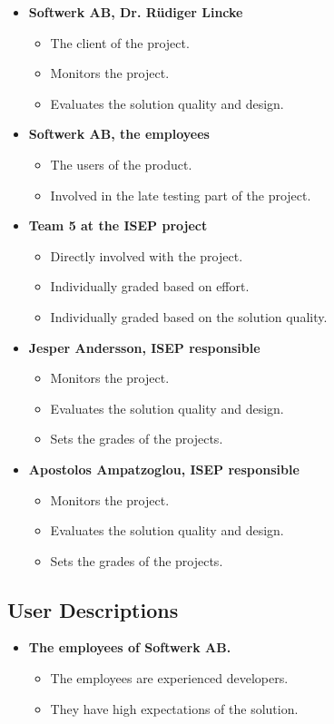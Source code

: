 \begin{itemize}
\item \textbf{Softwerk AB, Dr. Rüdiger Lincke}
\begin{itemize}
\item The client of the project.
\item Monitors the project.
\item Evaluates the solution quality and design.
\end{itemize}

\item \textbf{Softwerk AB, the employees}
\begin{itemize}
\item The users of the product.
\item Involved in the late testing part of the project.
\end{itemize}

\item \textbf{Team 5 at the ISEP project}
\begin{itemize}
\item Directly involved with the project.
\item Individually graded based on effort.
\item Individually graded based on the solution quality.
\end{itemize}

\item \textbf{Jesper Andersson, ISEP responsible}
\begin{itemize}
\item Monitors the project.
\item Evaluates the solution quality and design.
\item Sets the grades of the projects.
\end{itemize}
\item \textbf{Apostolos Ampatzoglou, ISEP responsible}
\begin{itemize}
\item Monitors the project.
\item Evaluates the solution quality and design.
\item Sets the grades of the projects.
\end{itemize}
\end{itemize}

\subsection{User Descriptions}
\begin{itemize}
\item \textbf{The employees of Softwerk AB.}
\begin{itemize}
\item The employees are experienced developers.
\item They have high expectations of the solution.

\end{itemize}
\end{itemize}

